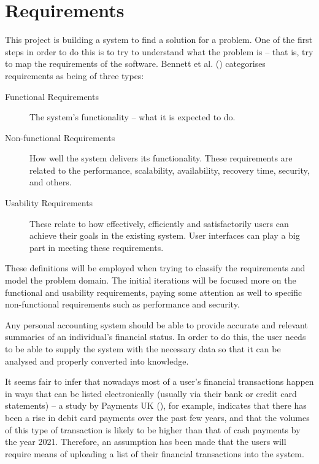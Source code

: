 \section{Requirements} \label{sec:Requirements}
This project is building a system to find a solution for a problem. One of the
first steps in order to do this is to try to understand what the problem is --
that is, try to map the requirements of the software. 
Bennett et al.
(\citeyear[][pp.~140-142]{bennett2010object}) categorises requirements as being
of three types:

\begin{description} \item[Functional Requirements]
    The system's functionality -- what it is expected to do.
    
  \item[Non-functional Requirements]
    How well the system delivers its functionality. These requirements are
    related to the performance, scalability, availability, recovery time,
    security, and others.

  \item[Usability Requirements]
    These relate to how effectively, efficiently and satisfactorily users can
    achieve their goals in the existing system. User interfaces can play a big
    part in meeting these requirements.
\end{description}

These definitions will be employed when trying to classify the requirements and
model the problem domain. The initial iterations will be focused more on the
functional and usability requirements, paying some attention as well to
specific non-functional requirements such as performance and security.

Any personal accounting system should be able to provide accurate and relevant
summaries of an individual's financial status. In order to do this, the user
needs to be able to supply the system with the necessary data so that it can be
analysed and properly converted into knowledge.

It seems fair to infer that nowadays most of a user's financial transactions
happen in ways that can be listed electronically (usually via their bank or
credit card statements) -- a study by Payments UK
(\citeyear{paymentsUK2017summary}), for example, indicates that there has been
a rise in debit card payments over the past few years, and that the volumes of
this type of transaction is likely to be higher than that of cash payments by
the year 2021. Therefore, an assumption has been made that the users will
require means of uploading a list of their financial transactions into the
system.

